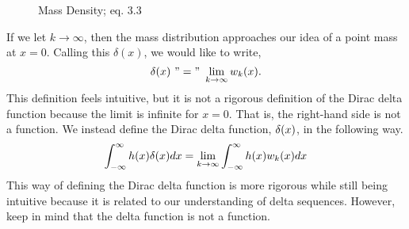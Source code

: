 \begin{figure}
    \centering
    \caption{Mass Density;  eq. 3.3}
\end{figure}

If we let \(k \rightarrow \infty\), then the mass distribution approaches our idea of a point mass at \(x=0\). Calling this \(\delta(x)\), we would like to write,
\begin{equation} \label{eq:deltaSeqLim}
    \delta(x)\ "="\ \lim_{k\rightarrow \infty} w_k(x).
\end{equation}
This definition feels intuitive, but it is not a rigorous definition of the Dirac delta function because the limit is infinite for \(x=0\). That is, the right-hand side is not a function. We instead define the Dirac delta function, \(\delta(x)\), in the following way.
\begin{equation}
    \int_{-\infty}^{\infty} h(x)\delta(x)dx = \lim_{k\rightarrow \infty}\int_{-\infty}^{\infty} h(x)w_k(x)dx
\end{equation}
This way of defining the Dirac delta function is more rigorous while still being intuitive because it is related to our understanding of delta sequences. However, keep in mind that the delta function is not a function.

